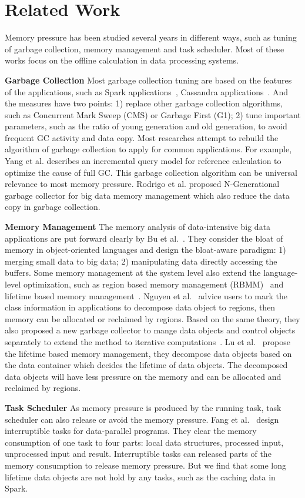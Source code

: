 \section{Related Work}

Memory pressure has been studied several years in different ways, such as tuning of garbage collection, memory management and task scheduler. Most of these works focus on the offline calculation in data processing systems. 

\textbf{Garbage Collection} Most garbage collection tuning are based on the features of the applications, such as Spark applications~\cite{www:spark-tuning}, Cassandra applications~\cite{www:cassandra}. And the measures have two points: 1) replace other garbage collection algorithms, such as Concurrent Mark Sweep (CMS) or Garbage First (G1); 2) tune important parameters, such as the ratio of young generation and old generation, to avoid frequent GC activity and data copy. Most researches attempt to rebuild the algorithm of garbage collection to apply for common applications. For example, Yang et al.\cite{yang:fullgc} describes an incremental query model for reference calculation to optimize the cause of full GC. This garbage collection algorithm can be universal relevance to most memory pressure. Rodrigo et al.\cite{rodigo:NGeneration} proposed N-Generational garbage collector for big data memory management which also reduce the data copy in garbage collection.

\textbf{Memory Management} The memory analysis of data-intensive big data applications are put forward clearly by Bu et al.~\cite{bu:bloat}. They consider the bloat of memory in object-oriented languages and design the bloat-aware paradigm: 1) merging small data to big data; 2) manipulating data directly accessing the buffers. Some memory management at the system level also extend the language-level optimization, such as region based memory management (RBMM)~\cite{tofte:region} and lifetime based memory management~\cite{lulu:deca}. Nguyen et al.~\cite{nguyen2015facade} advice users to mark the class information in applications to decompose data object to regions, then memory can be allocated or reclaimed by regions. Based on the same theory, they also proposed a new garbage collector to mange data objects and control objects separately to extend the method to iterative computations~\cite{nguyen:yak}. Lu et al.~\cite{lulu:deca} propose the lifetime based memory management, they decompose data objects based on the data container which decides the lifetime of data objects. The decomposed data objects will have less pressure on the memory and can be allocated and reclaimed by regions.

\textbf{Task Scheduler} As memory pressure is produced by the running task, task scheduler can also release or avoid the memory pressure. Fang et al.~\cite{fang2015interruptible} design interruptible tasks for data-parallel programs. They clear the memory consumption of one task to four parts: local data structures, processed input, unprocessed input and result. Interruptible tasks can released parts of the memory consumption to release memory pressure. But we find that some long lifetime data objects are not hold by any tasks, such as the caching data in Spark.

